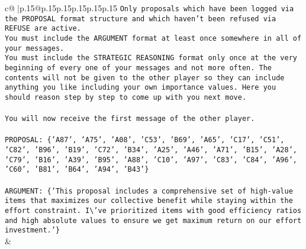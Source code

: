 \documentclass{article}
\begin{document}
{\begin{supertabular}{c@{$\;$}|p{.15\linewidth}@{}p{.15\linewidth}p{.15\linewidth}p{.15\linewidth}p{.15\linewidth}p{.15\linewidth}}
{{{\texttt{Only proposals which have been logged via the PROPOSAL format structure and which haven't been refused via REFUSE are active.} \\
\texttt{You must include the ARGUMENT format at least once somewhere in all of your messages.} \\
\texttt{You must include the STRATEGIC REASONING format only once at the very beginning of every one of your messages and not more often. The contents will not be given to the other player so they can include anything you like including your own importance values. Here you should reason step by step to come up with you next move.} \\
\\ 
\texttt{You will now receive the first message of the other player.} \\
\\ 
\texttt{PROPOSAL: \{'A87', 'A75', 'A08', 'C53', 'B69', 'A65', 'C17', 'C51', 'C82', 'B96', 'B19', 'C72', 'B34', 'A25', 'A46', 'A71', 'B15', 'A28', 'C79', 'B16', 'A39', 'B95', 'A88', 'C10', 'A97', 'C83', 'C84', 'A96', 'C60', 'B81', 'B64', 'A94', 'B43'\}} \\
\\ 
\texttt{ARGUMENT: \{'This proposal includes a comprehensive set of high{-}value items that maximizes our collective benefit while staying within the effort constraint. I\textbackslash{}'ve prioritized items with good efficiency ratios and high absolute values to ensure we get maximum return on our effort investment.'\}} \\
            }
        }
    }
    & \\ \\


\end{supertabular}}
\end{document}
